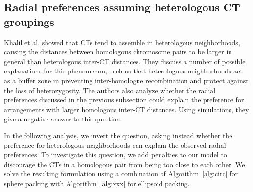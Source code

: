 \documentclass{siamltex}
\begin{document}
\subsection{Radial preferences assuming heterologous CT groupings}
\label{sec:homologs}

Khalil et al. \cite{Khalil_heterologues} showed that CTs tend to
assemble in heterologous neighborhoods, causing the distances between
homologous chromosome pairs to be larger in general than heterologous
inter-CT distances. They discuss a number of possible explanations for
this phenomenon, such as that heterologous neighborhoods act as a
buffer zone in preventing inter-homologue recombination and protect
against the loss of heterozygosity. The authors also analyze whether
the radial preferences discussed in the previous subsection could
explain the preference for arrangements with larger homologous
inter-CT distances. Using simulations, they give a negative answer to
this question.

In the following analysis, we invert the question, asking instead
whether the preference for heterologous neighborhoods can explain the
observed radial preferences. To investigate this question, we add
penalties to our model to discourage the CTs in a homologous pair from
being too close to each other. We solve the resulting formulation
using a combination of Algorithm~\ref{alg:circ} for sphere packing
with Algorithm~\ref{alg:xxx} for ellipsoid packing.
\end{document}
